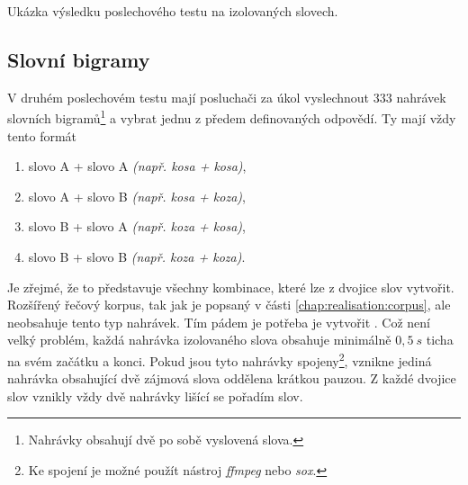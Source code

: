 \begin{table}[htpb]
  \centering
  \def\arraystretch{1.5}
  \caption{Ukázka výsledku poslechového testu na izolovaných slovech.}
  \label{tab:realisation:listening:isolated}
\end{table}

\subsection{Slovní bigramy}
\label{chap:realisation:listening:bigrams}

V druhém poslechovém testu mají posluchači za úkol vyslechnout $333$ nahrávek slovních bigramů\footnote{Nahrávky obsahují dvě po sobě vyslovená slova.} a vybrat jednu z předem definovaných odpovědí. Ty mají vždy tento formát

\begin{enumerate}[label=\alph*)]
  \item slovo A + slovo A \textit{(např. kosa + kosa)},
  \item slovo A + slovo B \textit{(např. kosa + koza)},
  \item slovo B + slovo A \textit{(např. koza + kosa)},
  \item slovo B + slovo B \textit{(např. koza + koza)}.
\end{enumerate}

\noindent Je zřejmé, že to představuje všechny kombinace, které lze z dvojice slov vytvořit. Rozšířený řečový korpus, tak jak je popsaný v části \ref{chap:realisation:corpus}, ale neobsahuje tento typ nahrávek. Tím pádem je potřeba je vytvořit . Což není velký problém, každá nahrávka izolovaného slova obsahuje minimálně $0,5\ s$ ticha na svém začátku a konci. Pokud jsou tyto nahrávky spojeny\footnote{Ke spojení je možné použít nástroj \textit{ffmpeg} nebo \textit{sox}.}, vznikne jediná nahrávka obsahující dvě zájmová slova oddělena krátkou pauzou. Z každé dvojice slov vznikly vždy dvě nahrávky lišící se pořadím slov.


